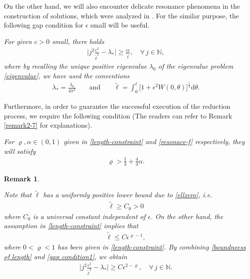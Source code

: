 \documentclass[10pt, reqno]{amsart}
\numberwithin{equation}{section}
\theoremstyle{definition}
\newtheorem{remark}[theorem]{Remark}
\begin{document}
{\medskip
On the other hand, we will also encounter delicate resonance phenomena in the construction of solutions, which were analyzed in \cite{delPKowWei1}.
For the similar purpose, the following gap condition for $\epsilon$ small will be useful.

\smallskip{}
{\it{
For given $c>0$ small, there holds
\begin{align} \label{gap condition1}
\Big| j^2 \frac{\epsilon^2}{{\tilde\ell}^2} - \lambda_* \Big| \geq \frac{c \epsilon}{{\tilde\ell}}, \quad \forall\,j \in \mathbb N,
\end{align}
where by recalling the unique positive eigenvalue $\lambda_0$ of the eigenvalue problem \eqref{eigenvalue}, we have used the conventions
\begin{align}
\lambda_* = \frac{\lambda_0} {4\pi^2}
\qquad \text{and}\qquad
{\tilde\ell} = \int_0^{\ell} \big[1+ \epsilon^2 W(0, \theta)\big]^{\frac{1}{2}} {\mathrm d} \theta.
\label{lambda*}
\end{align}
}}



Furthermore, in order to guarantee the successful execution of the reduction process, we require the following condition (The readers can refer to Remark \ref{remark2-7} for explanations).

\smallskip {}
{\it{
For $\varrho, \alpha\in (0, 1)$ given in \eqref{length-constraint} and \eqref{resonace-f} respectively, they will satisfy
\begin{align}
 \varrho> \frac 13+ \frac43 \alpha.
\label{constraint-alpha-varrho}
\end{align}
}
}

\begin{remark}\label{remark2-4}
{\it
Note that ${\tilde\ell}$ has a uniformly positive lower bound due to \eqref{ellzero}, i.e.
\begin{align}
{\tilde\ell}\geq C_0>0
\label{tildeell-lowerbound}
\end{align}
where $C_0$ is a universal constant independent of $\epsilon$.
On the other hand, the assumption in \eqref{length-constraint} implies that
\begin{align}
{\tilde\ell}
\leq C\epsilon^{\varrho-1},
\label{boundneess of length}
\end{align}
where $0<\varrho<1$ has been given in \eqref{length-constraint}.
By combining \eqref{boundneess of length} and \eqref{gap condition1}, we obtain
\begin{align} \label{gap condition222222}
\Big| j^2 \frac{\epsilon^2}{{\tilde\ell}^2} - \lambda_* \Big| \geq C \epsilon^{2-\varrho}, \quad \forall\,j \in \mathbb N.
\end{align}

}
\end{remark}}
\end{document}
